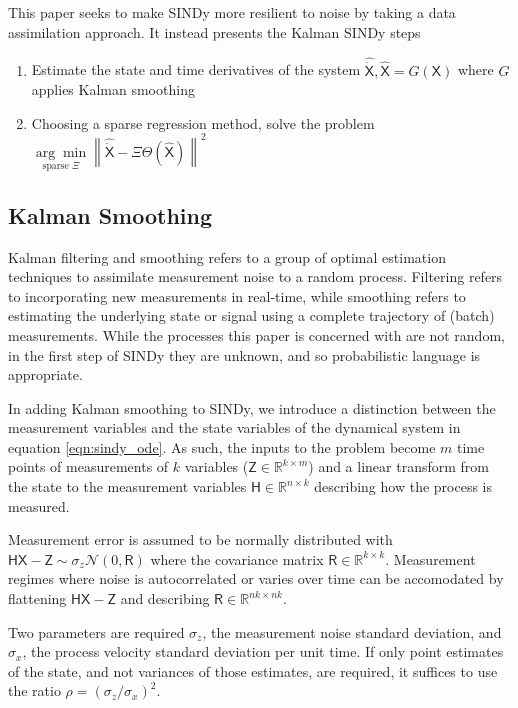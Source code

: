 \documentclass{article}
\newcommand{\mat}[1]{\boldsymbol{\mathsf{#1}}}
\newcommand{\R}[1]{\mathbb{R}^{#1}}
\begin{document}

This paper seeks to make SINDy more resilient to noise by taking a data assimilation approach.  It instead presents the Kalman SINDy steps
\begin{enumerate}
    \item Estimate the state and time derivatives of the system ${\mat{\widehat{\dot X}}}, \mat{\widehat X} = G(\mat X)$ where $G$ applies Kalman smoothing
    \item Choosing a sparse regression method, solve the problem $\underset{\text{sparse } \mat \Xi}{\arg\min} \left\| \mat{\widehat{\dot{X}}} - \mat \Xi \mat \Theta(\mat {\widehat X}) \right\|^2$
\end{enumerate}

\subsection{Kalman Smoothing}

Kalman filtering and smoothing refers to a group of optimal estimation techniques to assimilate measurement noise to a random process.
Filtering refers to incorporating  new measurements in real-time, while smoothing refers to estimating the underlying state or signal using a complete trajectory of (batch) measurements.
While the processes this paper is concerned with are not random, in the first step of SINDy they are unknown, and so probabilistic language is appropriate.

In adding Kalman smoothing to SINDy, we introduce a distinction between the measurement variables and the state variables of the dynamical system in equation
\ref{eqn:sindy_ode}.  As such, the inputs to the problem become $m$ time points of measurements of $k$ variables ($\mat Z\in \R{k\times m}$) and a linear transform from the state to the measurement variables $\mat H \in \R{n \times k}$ describing how the process is measured.

Measurement error is assumed to be normally distributed with $\mat H \mat X - \mat Z \sim \sigma_z \mathcal N(0, \mat R)$ where the covariance matrix $\mat R\in\R{k \times k}$.  Measurement regimes where noise is autocorrelated or varies over time can be accomodated by flattening $\mat H \mat X - \mat Z$ and describing $\mat R\in\R{nk \times nk}$.

Two parameters are required $\sigma_z$, the measurement noise standard deviation, and $\sigma_x$, the process velocity standard deviation per unit time.  If only point estimates of the state, and not variances of those estimates, are required, it suffices to use the ratio $\rho = (\sigma_z / \sigma_x)^2$.
\end{document}
